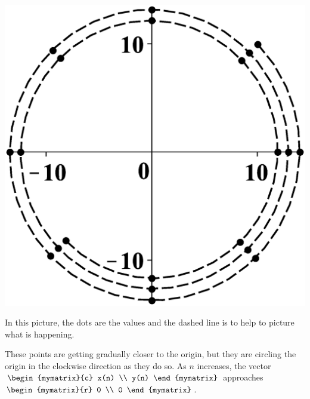 \begin{solution}
  \begin{center}
    \includegraphics[bb=0 0 800 800,scale=.2]{figures/4dec.eps}
  \end{center}

  In this picture, the dots are the values and the dashed line is to
  help to picture what is happening.

  These points are getting gradually closer to the origin, but they
  are circling the origin in the clockwise direction as they do so. As
  $n$ increases, the vector $\begin{mymatrix}{c}
    x(n) \\
    y(n)
  \end{mymatrix}$ approaches $ \begin{mymatrix}{r}
    0 \\
    0
  \end{mymatrix}$.
\end{solution}

